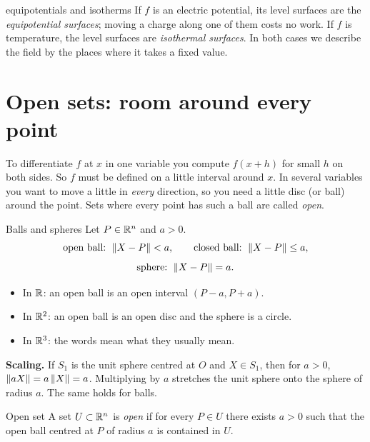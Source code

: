 \begin{reallife}{equipotentials and isotherms}
If $f$ is an electric potential, its level surfaces are the \emph{equipotential surfaces};
moving a charge along one of them costs no work. If $f$ is temperature, the level
surfaces are \emph{isothermal surfaces}. In both cases we describe the field by the
places where it takes a fixed value.
\end{reallife}

\section{Open sets: room around every point}

\begin{intuition}
To differentiate $f$ at $x$ in one variable you compute $f(x+h)$ for small $h$ on both
sides. So $f$ must be defined on a little interval around $x$. In several variables
you want to move a little in \emph{every} direction, so you need a little disc (or ball)
around the point. Sets where every point has such a ball are called \emph{open}.
\end{intuition}

\begin{definition}{Balls and spheres}
Let $P\in\mathbb{R}^n$ and $a>0$.
\[
\text{open ball: } \left\lVert X-P\right\rVert<a,\qquad
\text{closed ball: } \left\lVert X-P\right\rVert\le a,
\]
\[ \text{sphere: } \left\lVert X-P\right\rVert=a. \]
\end{definition}

\begin{itemize}
  \item In $\mathbb{R}$: an open ball is an open interval $(P-a,P+a)$.
  \item In $\mathbb{R}^2$: an open ball is an open disc and the sphere is a circle.
  \item In $\mathbb{R}^3$: the words mean what they usually mean.
\end{itemize}

\textbf{Scaling.} If $S_1$ is the unit sphere centred at $O$ and $X\in S_1$, then for
$a>0$, $\left\lVert aX\right\rVert=a\left\lVert X\right\rVert=a$. Multiplying by $a$ stretches the unit sphere onto the sphere of
radius $a$. The same holds for balls.

\begin{definition}{Open set}
A set $U\subset\mathbb{R}^n$ is \emph{open} if for every $P\in U$ there exists $a>0$ such that
the open ball centred at $P$ of radius $a$ is contained in $U$.
\end{definition}

